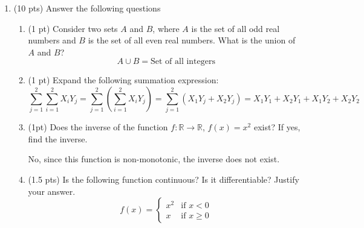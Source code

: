 \documentclass{./../../../Latex/tests}
\begin{document}
\thispagestyle{plain}
\vspace{0.5em}

\begin{enumerate}	

\item (10 pts) Answer the following questions
\begin{enumerate}
\item (1 pt) Consider two sets $A$ and $B$, where $A$ is the set of all odd real numbers and $B$ is the set of all even real numbers. What is the union of $A$ and $B$? 
$$ A \cup B = \text{Set of all integers} $$
\item (1 pt) Expand the following summation expression: $$\sum_{j=1}^2  \sum_{i=1}^2 X_i Y_j = \sum_{j=1}^2  \left(\sum_{i=1}^2 X_i Y_j \right) = \sum_{j=1}^2 \left( X_1 Y_j + X_2 Y_j \right) = X_1 Y_1 + X_2 Y_1 + X_1 Y_2 + X_2 Y_2 $$
 \vspace{1em}
\item (1pt) Does the inverse of the function $f: \mathbb{R} \rightarrow \mathbb{R}$, $f(x)=x^2$ exist? If yes, find the inverse. 

No, since this function is non-monotonic, the inverse does not exist. \\

\item (1.5 pts) Is the following function continuous? Is it differentiable? Justify your answer.
$$ f(x) = 
    \begin{cases} 
    x^2 & \text{if } x < 0 \\
    x & \text{if } x \geq 0 
    \end{cases} $$


\end{enumerate}
\end{enumerate}
\end{document}
